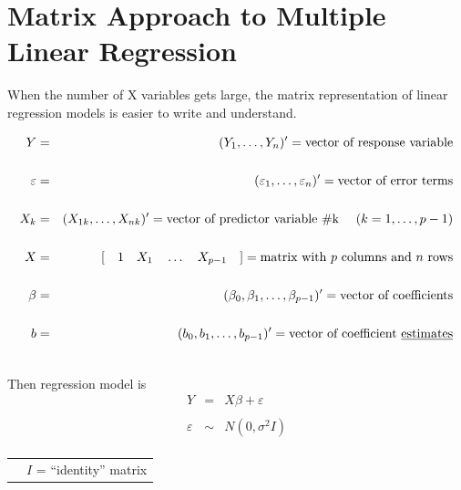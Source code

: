 \documentclass[12pt]{notes}
\begin{document}
\newpage

\section{Matrix Approach to Multiple Linear Regression}

When the number of X variables gets large, the matrix representation of linear regression models is easier to write and understand. 


\begin{eqnarray}
  Y & = & (Y_1, \ldots, Y_n)'  =  \mbox{vector of response variable} \nonumber \\
   & \nonumber \\
  \varepsilon & = & (\varepsilon_1, \ldots, \varepsilon_n)'  =  \mbox{vector of error terms}  \nonumber \\
   & \nonumber \\
  X_k & = & (X_{1k}, \ldots, X_{nk})'  =  \mbox{vector of predictor variable \#k \hspace{1em}}(k=1,\ldots,p-1) \nonumber \\
   & \nonumber \\
  X & = & [\mbox{\hspace{1em}} 1 \mbox{\hspace{1em}} X_1 \mbox{\hspace{1em}} \ldots \mbox{\hspace{1em}} X_{p-1} \mbox{\hspace{1em}} ] 
      = \mbox{matrix with $p$ columns and $n$ rows} \nonumber \\
   & \nonumber \\
  \beta & = & (\beta_0, \beta_1, \ldots, \beta_{p-1})'  = \mbox{vector of coefficients} \nonumber \\
     & \nonumber \\
  b & = & (b_0, b_1, \ldots, b_{p-1})'  = \mbox{vector of coefficient \underline{estimates}} \nonumber \\
   & \nonumber
\end{eqnarray}

Then regression model is
\begin{eqnarray}
  Y & = & X \beta + \varepsilon \nonumber \\
    & \nonumber \\
  \varepsilon & \sim & N(0,\sigma^2 I) \nonumber \\
    & \nonumber
\end{eqnarray}

\vspace{-3.5em}
\begin{tabular}{l l}
\hspace{25em} &
\begin{minipage}[t]{2in}
 $I$ = ``identity'' matrix
\end{minipage}
\end{tabular}
\end{document}
